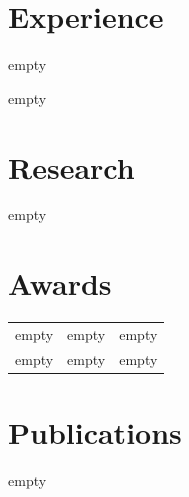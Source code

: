 \documentclass[]{deedy-resume-openfont}
\begin{document}
\begin{minipage}[t]{0.66\textwidth}

\section{Experience}
\vspace{\topsep}
\begin{tightemize}
\item empty
\item empty
\end{tightemize}
\sectionsep

\section{Research}
empty
\sectionsep

\section{Awards}
\begin{tabular}{rll}
empty & empty & empty \\
empty & empty & empty \\
\end{tabular}
\sectionsep

\section{Publications}
empty

\end{minipage}
\end{document}
